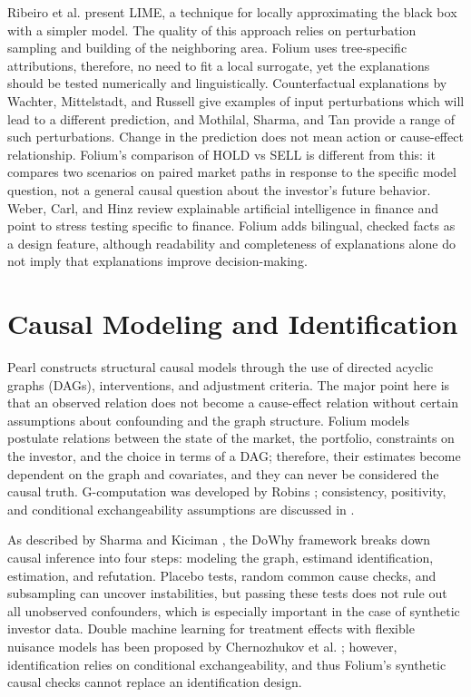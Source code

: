 Ribeiro et al. \cite{b8} present LIME, a technique for locally approximating the black box with a simpler model. The quality of this approach relies on perturbation sampling and building of the neighboring area. Folium uses tree-specific attributions, therefore, no need to fit a local surrogate, yet the explanations should be tested numerically and linguistically. Counterfactual explanations by Wachter, Mittelstadt, and Russell \cite{b9} give examples of input perturbations which will lead to a different prediction, and Mothilal, Sharma, and Tan \cite{b30} provide a range of such perturbations. Change in the prediction does not mean action or cause-effect relationship. Folium's comparison of HOLD vs SELL is different from this: it compares two scenarios on paired market paths in response to the specific model question, not a general causal question about the investor’s future behavior. Weber, Carl, and Hinz \cite{b34} review explainable artificial intelligence in finance and point to stress testing specific to finance. Folium adds bilingual, checked facts as a design feature, although readability and completeness of explanations alone do not imply that explanations improve decision-making.

\section{Causal Modeling and Identification}
\cite{b10} Pearl constructs structural causal models through the use of directed acyclic graphs (DAGs), interventions, and adjustment criteria. The major point here is that an observed relation does not become a cause-effect relation without certain assumptions about confounding and the graph structure. Folium models postulate relations between the state of the market, the portfolio, constraints on the investor, and the choice in terms of a DAG; therefore, their estimates become dependent on the graph and covariates, and they can never be considered the causal truth. G-computation was developed by Robins \cite{b36}; consistency, positivity, and conditional exchangeability assumptions are discussed in \cite{b37}.

As described by Sharma and Kiciman \cite{b11}, the DoWhy framework breaks down causal inference into four steps: modeling the graph, estimand identification, estimation, and refutation. Placebo tests, random common cause checks, and subsampling can uncover instabilities, but passing these tests does not rule out all unobserved confounders, which is especially important in the case of synthetic investor data. Double machine learning for treatment effects with flexible nuisance models has been proposed by Chernozhukov et al. \cite{b32}; however, identification relies on conditional exchangeability, and thus Folium’s synthetic causal checks cannot replace an identification design.

